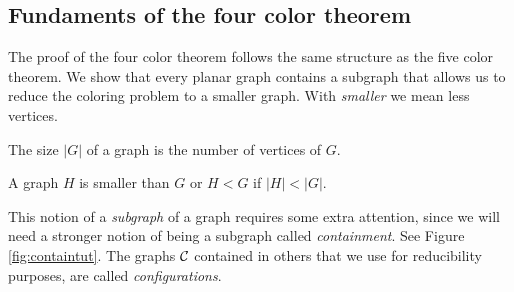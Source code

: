 \subsection{Fundaments of the four color theorem}

The proof of the four color theorem follows the same structure as the five color theorem. We show that every planar graph contains a subgraph that allows us to reduce the coloring problem to a smaller graph. With \textit{smaller} we mean less vertices.

\begin{definition}
    The size $|G|$ of a graph is the number of vertices of $G$.
\end{definition}

\begin{definition}
    A graph $H$ is smaller than $G$ or $H < G$ if $|H| < |G|$.
\end{definition}

This notion of a \textit{subgraph} of a graph requires some extra attention, since we will need a stronger notion of being a subgraph called \textit{containment}. See Figure \ref{fig:containtut}. The graphs $\mathcal{C}$ contained in others that we use for reducibility purposes, are called \emph{configurations}.

